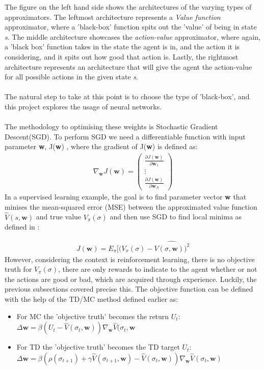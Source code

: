 \documentclass[ %
                    author={Ashwinder Khurana},
                supervisor={Prof Dave Cliff},
                    degree={MEng},
                     title={The Deeply Reinforced Trader},
                  subtitle={},
                      type={enterprise},
                      year={2020} ]{dissertation}
\def\gradient{
\begin{pmatrix}
    \frac{\partial J(\textbf{w})}{\partial\textbf{w}_1} \\
    \vdots \\
     \frac{\partial J(\textbf{w})}{\partial\textbf{w}_N}
\end{pmatrix}}
\begin{document}
{The figure on the left hand side shows the architectures of the varying types of approximators. The leftmost architecture represents a \textit{Value function} approximator, where a 'black-box' function spits out the 'value' of being in state \textit{s}. The middle architecture showcases the \textit{action-value} approximator, where again, a 'black box' function takes in the state the agent is in, and the action it is considering, and it spits out how good that action is. Lastly, the rightmost architecture represents an architecture that will give the agent the action-value for all possible actions in the given state \textit{s}. 
\\
\\
The natural step to take at this point is to choose the type of 'black-box', and this project explores the usage of neural networks. 
\\
\\
The methodology to optimising these weights is Stochastic Gradient Descent(SGD). To perform SGD we need a differentiable function with input parameter \textbf{w}, J(\textbf{w}) , where the gradient of J(\textbf{w}) is defined as:
\begin{equation}
\label{parameter-gradient}
\begin{split}
\nabla_\textbf{w} J(\textbf{w}) = \gradient
\end{split}
\end{equation}
In a supervised learning example, the goal is to find parameter vector \textbf{w} that minises the mean-squared error (MSE) between the approximated value function $\hat{V}(s, \textbf{w})$ and true value $V_\pi(\sigma)$ and then use SGD to find local minima as defined in \cite{https://www.davidsilver.uk/wp-content/uploads/2020/03/FA.pdf}:

\begin{equation}
\label{MSE-supervised}
\begin{split}
J(\textbf{w}) = E_\pi[(V_\pi(\sigma) - \hat{V(\sigma, \textbf{w}))^{2}}
\end{split}
\end{equation}
\noindent
However, considering the context is reinforcement learning, there is no objective truth for $V_\pi(\sigma)$, there are only rewards to indicate to the agent whether or not the actions are good or bad, which are acquired through experience. 
Luckily, the previous subsections covered precise this. The objective function can be defined with the help of the TD/MC method defined earlier as:
\begin{itemize}
\item For MC the 'objective truth' becomes the return $U_t$: $\Delta \textbf{w} = \beta(U_t - \hat{V}(\sigma_t, \textbf{w})) \nabla_\textbf{w} \hat{V}(\sigma_t, \textbf{w}$
\item For TD the 'objective truth' becomes the TD target $U_t$: $\Delta \textbf{w} = \beta(\rho(\sigma_{t+1}) + \gamma\hat{V}(\sigma_{t+1}, \textbf{w}) - \hat{V}(\sigma_t, \textbf{w})) \nabla_\textbf{w} \hat{V}(\sigma_t, \textbf{w})$
\end{itemize}

}
\end{document}
